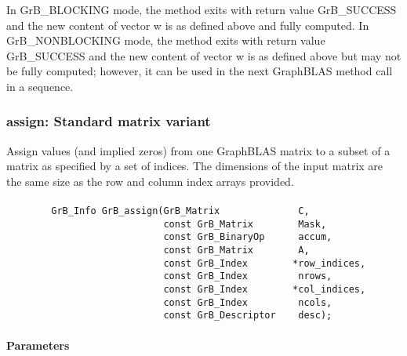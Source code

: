 In {\sf GrB\_BLOCKING} mode, the method exits with return value 
{\sf GrB\_SUCCESS} and the new content of vector {\sf w} is as defined above
and fully computed.  
In {\sf GrB\_NONBLOCKING} mode, the method exits with return value 
{\sf GrB\_SUCCESS} and the new content of vector {\sf w} is as defined above 
but may not be fully computed; however, it can be used in the next GraphBLAS 
method call in a sequence.


\subsubsection{{\sf assign}: Standard matrix variant}

Assign values (and implied zeros) from one GraphBLAS matrix to a subset of a 
matrix as specified by a set of indices. The dimensions of the input matrix are
the same size as the row and column index arrays provided.

\paragraph{\syntax}

\begin{verbatim}
        GrB_Info GrB_assign(GrB_Matrix              C,
                            const GrB_Matrix        Mask,
                            const GrB_BinaryOp      accum,
                            const GrB_Matrix        A,
                            const GrB_Index        *row_indices,
                            const GrB_Index         nrows,
                            const GrB_Index        *col_indices,
                            const GrB_Index         ncols,
                            const GrB_Descriptor    desc);
\end{verbatim}

\paragraph{Parameters}


